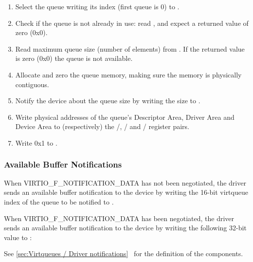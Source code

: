 \begin{enumerate}
\item Select the queue writing its index (first queue is 0) to
   .

\item Check if the queue is not already in use: read ,
   and expect a returned value of zero (0x0).

\item Read maximum queue size (number of elements) from
   . If the returned value is zero (0x0) the
   queue is not available.

\item Allocate and zero the queue memory, making sure the memory
   is physically contiguous.

\item Notify the device about the queue size by writing the size to
   .

\item Write physical addresses of the queue's Descriptor Area,
   Driver Area and Device Area to (respectively) the
   /,
   / and
   / register pairs.

\item Write 0x1 to .
\end{enumerate}

\subsubsection{Available Buffer Notifications}\label{sec:Virtio Transport Options / Virtio Over MMIO / MMIO-specific Initialization And Device Operation / Available Buffer Notifications}

When VIRTIO_F_NOTIFICATION_DATA has not been negotiated,
the driver sends an available buffer notification to the device by writing
the 16-bit virtqueue index
of the queue to be notified to .

When VIRTIO_F_NOTIFICATION_DATA has been negotiated,
the driver sends an available buffer notification to the device by writing
the following 32-bit value to :


See \ref{sec:Virtqueues / Driver notifications}~
for the definition of the components.

